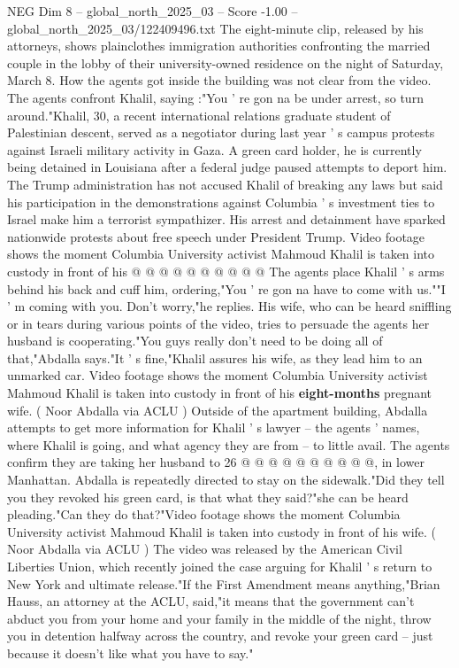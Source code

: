 \begin{textsample}{NEG Dim 8 – global\_north\_2025\_03 – Score -1.00 – global\_north\_2025\_03/122409496.txt}  \label{ex:f8_neg_364}
The eight-minute clip, released by his attorneys, shows plainclothes immigration authorities confronting the married couple in the lobby of their university-owned residence on the night of Saturday, March 8.
How the agents got inside the building was not clear from the video.
The agents confront Khalil, saying :"You ' re gon na be under arrest, so turn around."Khalil, 30, a recent international relations graduate student of Palestinian descent, served as a negotiator during last year ' s campus protests against Israeli military activity in Gaza.
A green card holder, he is currently being detained in Louisiana after a federal judge paused attempts to deport him.
The Trump administration has not accused Khalil of breaking any laws but said his participation in the demonstrations against Columbia ' s investment ties to Israel make him a terrorist sympathizer.
His arrest and detainment have sparked nationwide protests about free speech under President Trump.
Video footage shows the moment Columbia University activist Mahmoud Khalil is taken into custody in front of his @ @ @ @ @ @ @ @ @ @ The agents place Khalil ' s arms behind his back and cuff him, ordering,"You ' re gon na have to come with us.""I ' m coming with you.
Don't worry,"he replies.
His wife, who can be heard sniffling or in tears during various points of the video, tries to persuade the agents her husband is cooperating."You guys really don't need to be doing all of that,"Abdalla says."It ' s fine,"Khalil assures his wife, as they lead him to an unmarked car.
Video footage shows the moment Columbia University activist Mahmoud Khalil is taken into custody in front of his \textbf{eight-months} pregnant wife. ( Noor Abdalla via ACLU ) Outside of the apartment building, Abdalla attempts to get more information for Khalil ' s lawyer -- the agents ' names, where Khalil is going, and what agency they are from -- to little avail.
The agents confirm they are taking her husband to 26 @ @ @ @ @ @ @ @ @ @, in lower Manhattan.
Abdalla is repeatedly directed to stay on the sidewalk."Did they tell you they revoked his green card, is that what they said?"she can be heard pleading."Can they do that?"Video footage shows the moment Columbia University activist Mahmoud Khalil is taken into custody in front of his wife. ( Noor Abdalla via ACLU ) The video was released by the American Civil Liberties Union, which recently joined the case arguing for Khalil ' s return to New York and ultimate release."If the First Amendment means anything,"Brian Hauss, an attorney at the ACLU, said,"it means that the government can't abduct you from your home and your family in the middle of the night, throw you in detention halfway across the country, and revoke your green card -- just because it doesn't like what you have to say."

\end{textsample}
